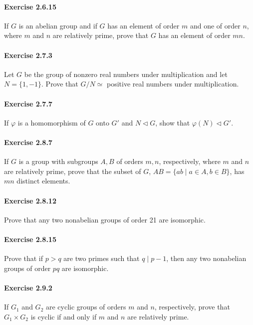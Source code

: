\documentclass{article}
\begin{document}
\paragraph{Exercise 2.6.15} If $G$ is an abelian group and if $G$ has an element of order $m$ and one of order $n$, where $m$ and $n$ are relatively prime, prove that $G$ has an element of order $mn$.

\paragraph{Exercise 2.7.3}
Let $G$ be the group of nonzero real numbers under multiplication and let
$N = \{1, -1\}$. Prove that $G / N \simeq$ positive real numbers under multiplication.

\paragraph{Exercise 2.7.7}
If $\varphi$ is a homomorphism of $G$ onto $G'$ and $N \triangleleft G$, show that
$\varphi(N) \triangleleft G'$.

\paragraph{Exercise 2.8.7}
If $G$ is a group with subgroups $A, B$ of orders $m, n$, respectively, where
$m$ and $n$ are relatively prime, prove that the subset of $G$,
$AB = \{ab \mid a \in A, b \in B\}$, has $mn$ distinct elements.

\paragraph{Exercise 2.8.12}
Prove that any two nonabelian groups of order 21 are isomorphic.

\paragraph{Exercise 2.8.15}
Prove that if $p > q$ are two primes such that $q \mid p - 1$, then any two
nonabelian groups of order $pq$ are isomorphic.

\paragraph{Exercise 2.9.2}
If $G_1$ and $G_2$ are cyclic groups of orders $m$ and $n$, respectively, prove
that $G_1 \times G_2$ is cyclic if and only if $m$ and $n$ are relatively prime.
\end{document}
